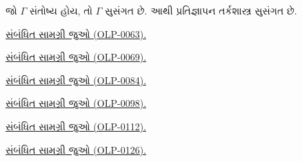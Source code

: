 \begin{cor}
જો $\Gamma$ સંતોષ્ય હોય, તો $\Gamma$ સુસંગત છે.
આથી પ્રતિજ્ઞાપન તર્કશાસ્ત્ર સુસંગત છે.
\end{cor}
\endgroup
\endgroup



\noindent\hyperref[guunit:OLP-0063]{સંબંધિત સામગ્રી જુઓ (OLP-0063).}\par


%
  \noindent\hyperref[guunit:OLP-0069]{સંબંધિત સામગ્રી જુઓ (OLP-0069).}\par


%
  \noindent\hyperref[guunit:OLP-0084]{સંબંધિત સામગ્રી જુઓ (OLP-0084).}\par


%
  \noindent\hyperref[guunit:OLP-0098]{સંબંધિત સામગ્રી જુઓ (OLP-0098).}\par


%
  \noindent\hyperref[guunit:OLP-0112]{સંબંધિત સામગ્રી જુઓ (OLP-0112).}\par


\noindent\hyperref[guunit:OLP-0126]{સંબંધિત સામગ્રી જુઓ (OLP-0126).}\par



\OLEndPartHook
